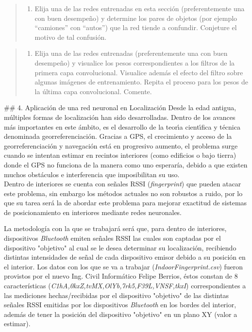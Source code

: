 \documentclass[11pt]{article}
\providecommand{\tightlist}{%
      \setlength{\itemsep}{0pt}\setlength{\parskip}{0pt}}
\begin{document}
\begin{quote}
\begin{enumerate}
\def\labelenumi{\alph{enumi})}
\setcounter{enumi}{9}
\tightlist
\item
  Elija una de las redes entrenadas en esta sección (preferentemente una
  con buen desempeño) y determine los pares de objetos (por ejemplo
  ``camiones'' con ``autos'') que la red tiende a confundir. Conjeture
  el motivo de tal confusión.
\end{enumerate}
\end{quote}

\begin{quote}
\begin{enumerate}
\def\labelenumi{\alph{enumi})}
\setcounter{enumi}{10}
\tightlist
\item
  Elija una de las redes entrenadas (preferentemente una con buen
  desempeño) y visualice los pesos correspondientes a los filtros de la
  primera capa convolucional. Visualice además el efecto del filtro
  sobre algunas imágenes de entrenamiento. Repita el proceso para los
  pesos de la última capa convolucional. Comente.
\end{enumerate}
\end{quote}

     \#\# 4. Aplicación de una red neuronal en Localización Desde la edad
antigua, múltiples formas de localización han sido desarrolladas. Dentro
de los avances más importantes en este ámbito, es el desarrollo de la
teorı́a cientı́fica y técnica denominada georreferenciación. Gracias a
GPS, el crecimiento y acceso de la georreferenciación y navegación está
en progresivo aumento, el problema surge cuando se intentan estimar en
recintos interiores (como edificios o bajo tierra) donde el GPS no
funciona de la manera como uno esperaría, debido a que existen muchos
obstáculos e interferencia que imposibilitan su uso.\\
Dentro de interiores se cuenta con señales RSSI (\emph{fingerprint}) que
pueden atacar este problema, sin embargo los métodos actuales no son
robustos a ruido, por lo que su tarea será la de abordar este problema
para mejorar exactitud de sistemas de posicionamiento en interiores
mediante redes neuronales.

La metodología con la que se trabajará será que, para dentro de
interiores, dispositivos \emph{Bluetooth} emiten señales RSSI las cuales
son captadas por el dispositivo "objetivo" al cual se le desea
determinar su localización, recibiendo distintas intensidades de señal
de cada dispositivo emisor debido a su posición en el interior. Los
datos con los que se va a trabajar (\emph{IndoorFingerprint.csv}) fueron
provistos por el nuevo Ing. Civil Informático Felipe Berrios, éstos
constan de 8 características
(\emph{C1hA,0kxZ,tvMX,OlYb,7rk5,F39L,VNSF,tkxI}) correspondientes a las
mediciones hechas/recibidas por el dispositivo "objetivo" de las
distintas señales RSSI emitidas por los dispositivos \emph{Bluetooth} en
los bordes del interior, además de tener la posición del dispositivo
"objetivo" en un plano XY (valor a estimar).
\end{document}
